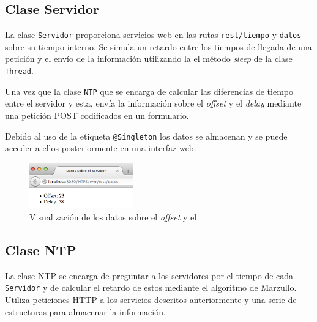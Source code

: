 \documentclass{article}
\newcommand{\javacode}[4]{
	
}
\begin{document}
\subsection{Clase Servidor}

La clase \verb+Servidor+ proporciona servicios web en las rutas \verb+rest/tiempo+ y \verb+datos+ sobre su tiempo interno. Se simula un retardo entre los tiempos de llegada de una petición y el envío de la información utilizando la el método \textit{sleep} de la clase \verb+Thread+.

\javacode{net/martinarroyo/ntp/Servidor}{El servicio atiende las peticiones y genera una respuesta con un retardo entre 1 y 4 segundos.}{31}{50}

Una vez que la clase \verb+NTP+ que se encarga de calcular las diferencias de tiempo entre el servidor y esta, envía la información sobre el \textit{offset} y el \textit{delay} mediante una petición POST codificados en un formulario.

\javacode{net/martinarroyo/ntp/Servidor}{El método procesa los datos recibidos y los almacena para poder utilizarlos posteriormente}{99}{103}

Debido al uso de la etiqueta \verb+@Singleton+ los datos se almacenan y se puede acceder a ellos posteriormente en una interfaz web.

\begin{figure}[H]
   \begin{center}
   \includegraphics[width=0.4\textwidth]{interfazWeb}
   \caption{Visualización de los datos sobre el \textit{offset} y el }
   \end{center}
\end{figure} 

\subsection{Clase NTP}

La clase NTP se encarga de preguntar a los servidores por el tiempo de cada \verb+Servidor+ y de calcular el retardo de estos mediante el algoritmo de Marzullo. Utiliza peticiones HTTP a los servicios descritos anteriormente y una serie de estructuras para almacenar la información.
\end{document}
